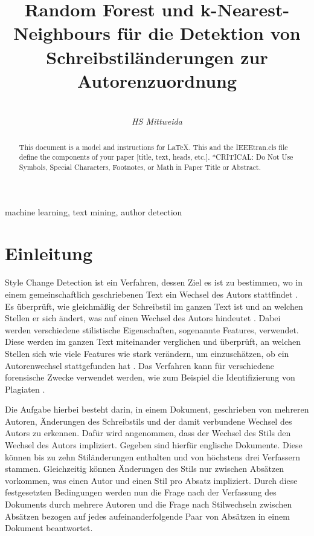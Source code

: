 \documentclass[conference]{IEEEtran}
\begin{document}
\title{Random Forest und k-Nearest-Neighbours für die Detektion von Schreibstiländerungen zur Autorenzuordnung}





\author{
 \\
\textit{HS Mittweida}
}
\maketitle

\begin{abstract}
This document is a model and instructions for \LaTeX.
This and the IEEEtran.cls file define the components of your paper [title, text, heads, etc.]. *CRITICAL: Do Not Use Symbols, Special Characters, Footnotes, 
or Math in Paper Title or Abstract.
\end{abstract}

\begin{IEEEkeywords}
	machine learning, text mining, author detection
\end{IEEEkeywords}

\section{Einleitung}
	Style Change Detection ist ein Verfahren, dessen Ziel es ist zu bestimmen, wo in einem gemeinschaftlich geschriebenen Text ein Wechsel des Autors stattfindet \cite{e_b1}. Es überprüft, wie gleichmäßig der Schreibstil im ganzen Text ist und an welchen Stellen er sich ändert, was auf einen Wechsel des Autors hindeutet \cite{e_b2}. Dabei werden verschiedene stilistische Eigenschaften, sogenannte Features, verwendet. Diese werden im ganzen Text miteinander verglichen und überprüft, an welchen Stellen sich wie viele Features wie stark verändern, um einzuschätzen, ob ein Autorenwechsel stattgefunden hat \cite{e_b3}. Das Verfahren kann für verschiedene forensische Zwecke verwendet werden, wie zum Beispiel die Identifizierung von Plagiaten \cite{e_b2}.
	
	Die Aufgabe hierbei besteht darin, in einem Dokument, geschrieben von mehreren Autoren, Änderungen des Schreibstils und der damit verbundene Wechsel des Autors zu erkennen. Dafür wird angenommen, dass der Wechsel des Stils den Wechsel des Autors impliziert. Gegeben sind hierfür englische Dokumente. Diese können bis zu zehn Stiländerungen enthalten und von höchstens drei Verfassern stammen. Gleichzeitig können Änderungen des Stils nur zwischen Absätzen vorkommen, was einen Autor und einen Stil pro Absatz impliziert. Durch diese festgesetzten Bedingungen werden nun die Frage nach der Verfassung des Dokuments durch mehrere Autoren und die Frage nach Stilwechseln zwischen Absätzen bezogen auf jedes aufeinanderfolgende Paar von Absätzen in einem Dokument beantwortet.
	
\end{document}
